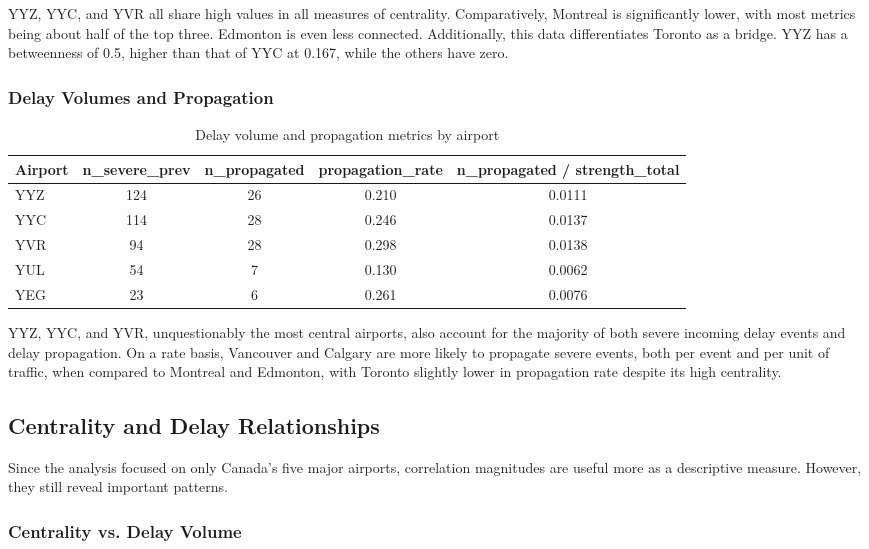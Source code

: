 \documentclass[9pt]{article}
\begin{document}
YYZ, YYC, and YVR all share high values in all measures of centrality. Comparatively, Montreal is significantly lower, with most metrics being about half of the top three. Edmonton is even less connected. Additionally, this data differentiates Toronto as a bridge. YYZ has a betweenness of 0.5, higher than that of YYC at 0.167, while the others have zero. 

\subsubsection{Delay Volumes and Propagation}

\begin{table}[h!]
    \centering
    \caption{Delay volume and propagation metrics by airport}
    \begin{tabular}{lcccc}
        \toprule
        Airport & n\_severe\_prev & n\_propagated & propagation\_rate & n\_propagated / strength\_total \\
        \midrule
        YYZ & 124 & 26 & 0.210 & 0.0111 \\
        YYC & 114 & 28 & 0.246 & 0.0137 \\
        YVR & 94  & 28 & 0.298 & 0.0138 \\
        YUL & 54  & 7  & 0.130 & 0.0062 \\
        YEG & 23  & 6  & 0.261 & 0.0076 \\
        \bottomrule
    \end{tabular}
\end{table}

YYZ, YYC, and YVR, unquestionably the most central airports, also account for the majority of both severe incoming delay events and delay propagation. On a rate basis, Vancouver and Calgary are more likely to propagate severe events, both per event and per unit of traffic, when compared to Montreal and Edmonton, with Toronto slightly lower in propagation rate despite its high centrality.

\subsection{Centrality and Delay Relationships}

Since the analysis focused on only Canada's five major airports, correlation magnitudes are useful more as a descriptive measure. However, they still reveal important patterns.

\subsubsection{Centrality vs. Delay Volume}
\end{document}
